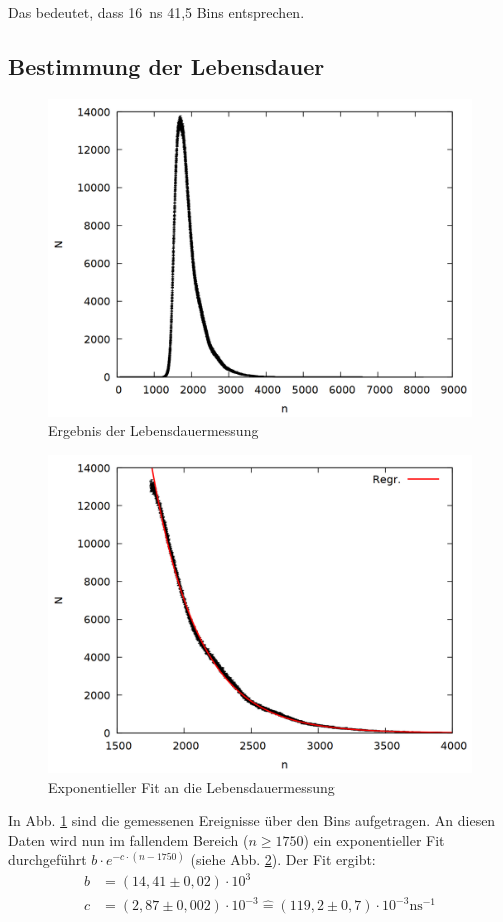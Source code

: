 Das bedeutet, dass \SI{16}{\nano\second} 41,5 Bins entsprechen.

\subsection{Bestimmung der Lebensdauer}

\begin{figure}
\centering
\includegraphics[width=0.7\linewidth]{data/uebernacht.png}
\caption{Ergebnis der Lebensdauermessung}
\label{fig:halflife}
\end{figure}

\begin{figure}
\centering
\includegraphics[width=0.7\linewidth]{data/uebernacht2.png}
\caption{Exponentieller Fit an die Lebensdauermessung}
\label{fig:halflife2}
\end{figure}

In Abb. \ref{fig:halflife} sind die gemessenen Ereignisse über den Bins aufgetragen. An diesen Daten wird nun im fallendem Bereich ($n \geq 1750$) ein exponentieller Fit durchgeführt $b\cdot e^{-c\cdot (n-1750)}$ (siehe Abb. \ref{fig:halflife2}). Der Fit ergibt:
\begin{align*}
b &= (14,41 \pm 0,02) \cdot 10^3\\
c &= (2,87 \pm 0,002) \cdot 10^{-3} \mathrel{\widehat{=}} (119,2 \pm 0,7)\cdot 10^{-3} \si{\nano\second}^{-1}\\
\end{align*}

